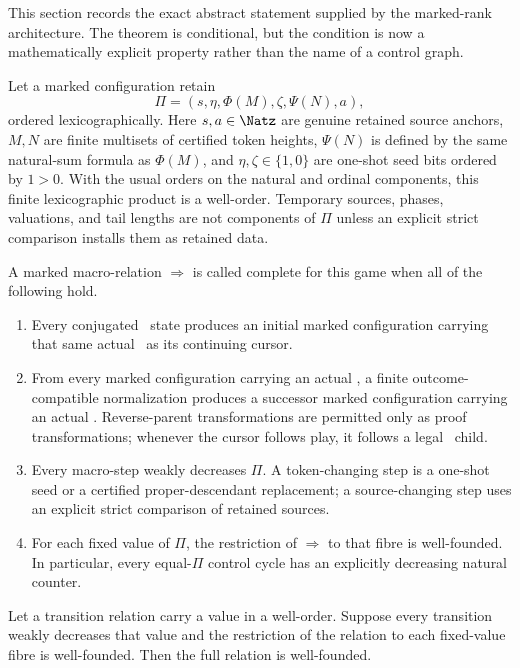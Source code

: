 This section records the exact abstract statement supplied by the marked-rank
architecture.  The theorem is conditional, but the condition is now a
mathematically explicit property rather than the name of a control graph.

Let a marked configuration retain
\[
  \Pi=(s,\eta,\Phi(M),\zeta,\Psi(N),a),
\]
ordered lexicographically.  Here $s,a\in\Natz$ are genuine retained source anchors, $M,N$ are
finite multisets of certified token heights, $\Psi(N)$ is defined by the
same natural-sum formula as $\Phi(M)$, and $\eta,\zeta\in\{1,0\}$ are
one-shot seed bits ordered by $1>0$.  With the usual orders on the natural
and ordinal components, this finite lexicographic product is a well-order.
Temporary sources, phases, valuations, and tail lengths are not components
of $\Pi$ unless an explicit strict comparison installs them as retained
data.

\begin{definition}
\label{def:complete-router}
A marked macro-relation $\Longrightarrow$ is called complete for this game
when all of the following hold.
\begin{enumerate}[label=(C\arabic*)]
\item Every conjugated \DRAW\ state produces an initial marked configuration
      carrying that same actual \DRAW\ as its continuing cursor.
\item From every marked configuration carrying an actual \DRAW, a finite
      outcome-compatible normalization produces a successor marked
      configuration carrying an actual \DRAW.  Reverse-parent transformations
      are permitted only as proof transformations; whenever the cursor follows
      play, it follows a legal \DRAW\ child.
\item Every macro-step weakly decreases $\Pi$.  A token-changing step is a
      one-shot seed or a certified proper-descendant replacement; a
      source-changing step uses an explicit strict comparison of retained
      sources.
\item For each fixed value of $\Pi$, the restriction of
      $\Longrightarrow$ to that fibre is well-founded.  In particular, every
      equal-$\Pi$ control cycle has an explicitly decreasing natural counter.
\end{enumerate}
\end{definition}

\begin{lemma}\label{lem:fibre}
Let a transition relation carry a value in a well-order.  Suppose every
transition weakly decreases that value and the restriction of the relation
to each fixed-value fibre is well-founded.  Then the full relation is
well-founded.
\end{lemma}

